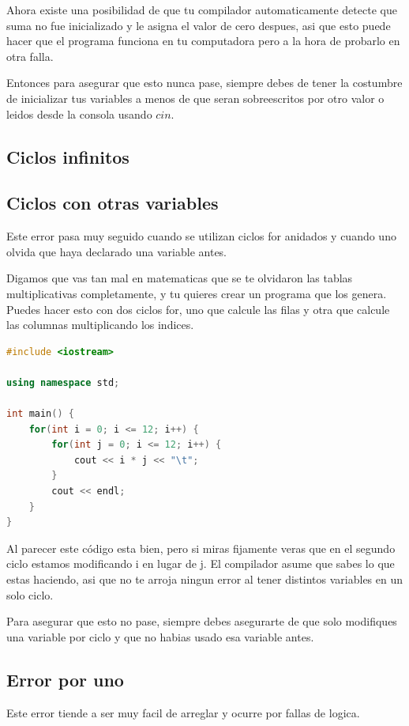 \documentclass{article}
\begin{document}
Ahora existe una posibilidad de que tu compilador automaticamente detecte que suma no fue inicializado y le asigna el valor de cero despues, asi que esto puede hacer que el programa funciona en tu computadora pero a la hora de probarlo en otra falla.

Entonces para asegurar que esto nunca pase, siempre debes de tener la costumbre de inicializar tus variables a menos de que seran sobreescritos por otro valor o leidos desde la consola usando $cin$.

\subsection{Ciclos infinitos}

\subsection{Ciclos con otras variables}
Este error pasa muy seguido cuando se utilizan ciclos for anidados y cuando uno olvida que haya declarado una variable antes.

Digamos que vas tan mal en matematicas que se te olvidaron las tablas multiplicativas completamente, y tu quieres crear un programa que los genera. Puedes hacer esto con dos ciclos for, uno que calcule las filas y otra que calcule las columnas multiplicando los indices.

\begin{lstlisting}[language=C++, caption=Ciclos con otras variables]
#include <iostream>

using namespace std;

int main() {
    for(int i = 0; i <= 12; i++) {
        for(int j = 0; i <= 12; i++) {
            cout << i * j << "\t";
        }
        cout << endl;
    }
}
\end{lstlisting}

Al parecer este código esta bien, pero si miras fijamente veras que en el segundo ciclo estamos modificando i en lugar de j. El compilador asume que sabes lo que estas haciendo, asi que no te arroja ningun error al tener distintos variables en un solo ciclo.

Para asegurar que esto no pase, siempre debes asegurarte de que solo modifiques una variable por ciclo y que no habias usado esa variable antes.

\subsection{Error por uno}
Este error tiende a ser muy facil de arreglar y ocurre por fallas de logica.
\end{document}
